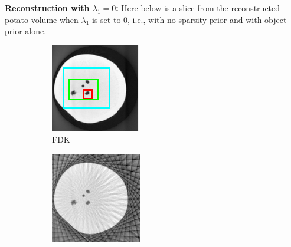 \documentclass{article}
\begin{document}
\textbf{Reconstruction with $\lambda_1 =0$:} Here below is a slice from the reconstructed potato volume when $\lambda_1$ is set to $0$, i.e., with no sparsity prior and with object prior alone.
\begin{figure}[!h]
    \begin{subfigure}[b]{0.3\linewidth}
        \includegraphics[width=\textwidth]{../images/potato/cs_lambda_0/testIm_green}
        \caption{FDK}
    \end{subfigure}
    \begin{subfigure}[b]{0.3\linewidth}
        \includegraphics[width=\textwidth]{../images/potato/cs_lambda_0/fdkIm_green.png}

\end{subfigure}
\end{figure}
\end{document}

